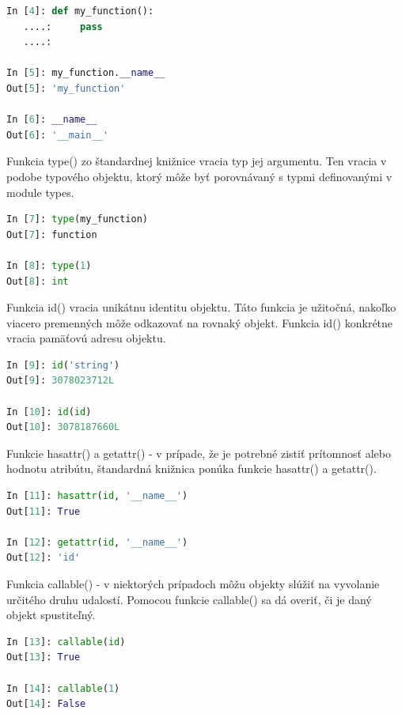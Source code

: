 \documentclass[11pt,oneside,final]{fithesis2}
\begin{document}
\begin{list}{•}{}
\begin{lstlisting}[language=python]		
In [4]: def my_function():
   ....:     pass
   ....: 

In [5]: my_function.__name__
Out[5]: 'my_function'

In [6]: __name__
Out[6]: '__main__'
\end{lstlisting}

		\item 
		
		Funkcia type() zo štandardnej knižnice vracia typ jej argumentu. Ten vracia v podobe typového objektu, ktorý môže byť porovnávaný s typmi definovanými v module types.

\begin{lstlisting}[language=python]	
In [7]: type(my_function)
Out[7]: function

In [8]: type(1)
Out[8]: int
\end{lstlisting}


		\item 
		
		Funkcia id() vracia unikátnu identitu objektu. Táto funkcia je užitočná, nakoľko viacero premenných môže odkazovať na rovnaký objekt. Funkcia id() konkrétne vracia pamäťovú adresu objektu.

\begin{lstlisting}[language=python]	
In [9]: id('string')
Out[9]: 3078023712L

In [10]: id(id)
Out[10]: 3078187660L
\end{lstlisting}

		\item Funkcie hasattr() a getattr() -
		v prípade, že je potrebné zistiť prítomnosť alebo hodnotu atribútu, štandardná knižnica ponúka funkcie hasattr() a getattr().

\begin{lstlisting}[language=python]	
In [11]: hasattr(id, '__name__')
Out[11]: True

In [12]: getattr(id, '__name__')
Out[12]: 'id'
\end{lstlisting}		

		\item Funkcia callable() -
		v niektorých prípadoch môžu objekty slúžiť na vyvolanie určitého druhu udalostí. Pomocou funkcie callable() sa dá overiť, či je daný objekt spustiteľný.

\begin{lstlisting}[language=python]	
In [13]: callable(id)
Out[13]: True

In [14]: callable(1)
Out[14]: False
\end{lstlisting}			



\end{list}
\end{document}
